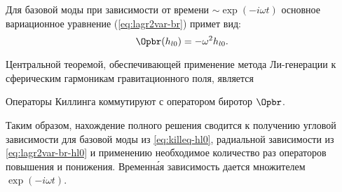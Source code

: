 \documentclass[\docroot/reports/draft/report.tex]{subfiles}
\begin{document}
    Для базовой моды при зависимости от времени $\sim\exp(-i\omega t)$ основное вариационное уравнение (\autoref{eq:lagr2var-br}) примет вид:
    \begin{equation}\label{eq:lagr2var-br-hl0}
        \Opbr(h_{l0}) = - \omega^2 h_{l0} .
    \end{equation}

    Центральной теоремой, обеспечивающей применение метода Ли-генерации к сферическим гармоникам гравитационного поля, является
    \begin{theorem}
        Операторы Киллинга коммутируют с оператором биротор $\Opbr$.
    \end{theorem}

    Таким образом, нахождение полного решения сводится к получению угловой зависимости для базовой моды из \autoref{eq:killeq-hl0}, радиальной зависимости из \autoref{eq:lagr2var-br-hl0} и применению необходимое количество раз операторов повышения и понижения. Временн\'{а}я зависимость дается множителем $\exp(-i \omega t)$.
\end{document}
